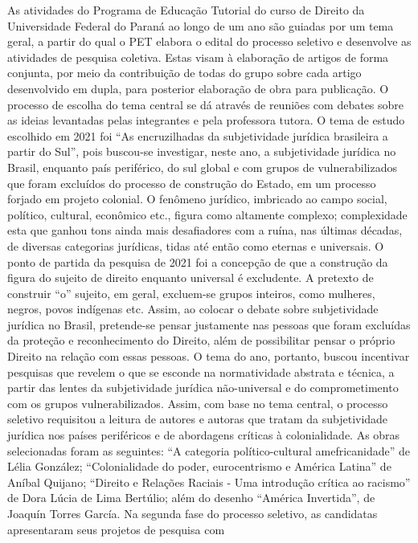 As atividades do Programa de Educação Tutorial do curso de Direito da Universidade
Federal do Paraná ao longo de um ano são guiadas por um tema geral, a partir do qual o PET
elabora o edital do processo seletivo e desenvolve as atividades de pesquisa coletiva. Estas visam
à elaboração de artigos de forma conjunta, por meio da contribuição de todas do grupo sobre
cada artigo desenvolvido em dupla, para posterior elaboração de obra para publicação. O
processo de escolha do tema central se dá através de reuniões com debates sobre as ideias
levantadas pelas integrantes e pela professora tutora.
O tema de estudo escolhido em 2021 foi “As encruzilhadas da subjetividade jurídica
brasileira a partir do Sul”, pois buscou-se investigar, neste ano, a subjetividade jurídica no Brasil,
enquanto país periférico, do sul global e com grupos de vulnerabilizados que foram excluídos do
processo de construção do Estado, em um processo forjado em projeto colonial.
O fenômeno jurídico, imbricado ao campo social, político, cultural, econômico etc.,
figura como altamente complexo; complexidade esta que ganhou tons ainda mais desafiadores
com a ruína, nas últimas décadas, de diversas categorias jurídicas, tidas até então como eternas e
universais. O ponto de partida da pesquisa de 2021 foi a concepção de que a construção da figura
do sujeito de direito enquanto universal é excludente. A pretexto de construir “o” sujeito, em
geral, excluem-se grupos inteiros, como mulheres, negros, povos indígenas etc. Assim, ao
colocar o debate sobre subjetividade jurídica no Brasil, pretende-se pensar justamente nas
pessoas que foram excluídas da proteção e reconhecimento do Direito, além de possibilitar
pensar o próprio Direito na relação com essas pessoas. O tema do ano, portanto, buscou
incentivar pesquisas que revelem o que se esconde na normatividade abstrata e técnica, a partir
das lentes da subjetividade jurídica não-universal e do comprometimento com os grupos
vulnerabilizados.
Assim, com base no tema central, o processo seletivo requisitou a leitura de autores e
autoras que tratam da subjetividade jurídica nos países periféricos e de abordagens críticas à
colonialidade. As obras selecionadas foram as seguintes: “A categoria político-cultural
amefricanidade” de Lélia González; “Colonialidade do poder, eurocentrismo e América Latina”
de Aníbal Quijano; “Direito e Relações Raciais - Uma introdução crítica ao racismo” de Dora
Lúcia de Lima Bertúlio; além do desenho “América Invertida”, de Joaquín Torres García. Na
segunda fase do processo seletivo, as candidatas apresentaram seus projetos de pesquisa com
